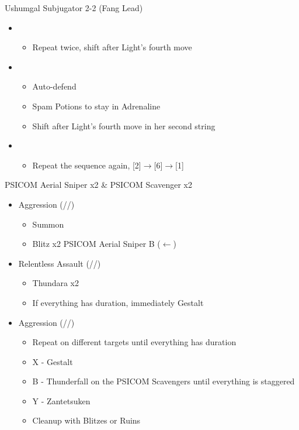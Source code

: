 \begin{battle}[2:21]{Ushumgal Subjugator 2-2 (Fang Lead)}
\begin{itemize}
			\item \third
			      \begin{itemize}
				      \item Repeat twice, shift after Light's fourth move
			      \end{itemize}
			\item \fourth
			      \begin{itemize}
				      \item Auto-defend
				      \item Spam Potions to stay in Adrenaline
				      \item Shift after Light's fourth move in her second string
			      \end{itemize}
			\item \second
			      \begin{itemize}
				      \item Repeat the sequence again, [2]$\rightarrow$[6]$\rightarrow$[1]
			      \end{itemize}
		\end{itemize}
	\end{battle}
	\renewcommand{\first}{[1] Aggression (\com/\com/\rav)}
	\renewcommand{\second}{[2] Relentless Assault (\rav/\com/\rav)}
	\begin{battle}[0:20]{PSICOM Aerial Sniper x2 \& PSICOM Scavenger x2}
		\begin{itemize}
			\item \first
			      \begin{itemize}
				      \item Summon
				      \item Blitz x2 PSICOM Aerial Sniper B ($\leftarrow$)
			      \end{itemize}
			\item \second
			      \begin{itemize}
				      \item Thundara x2
				      \item If everything has duration, immediately Gestalt
			      \end{itemize}
			\item \first
			      \begin{itemize}
				      \item Repeat on different targets until everything has duration
				      \item X - Gestalt
				      \item B - Thunderfall on the PSICOM Scavengers until everything is staggered
				      \item Y - Zantetsuken
				      \item Cleanup with Blitzes or Ruins
			      \end{itemize}
		\end{itemize}
		 
	\end{battle}
